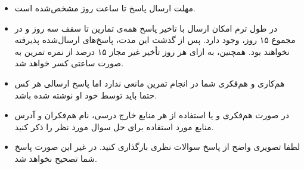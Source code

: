 \begin{itemize}
	\small
	\setlength\itemsep{0.05em}
	\item
	مهلت ارسال پاسخ تا ساعت  روز مشخص‌شده است.
	\item
	در طول ترم امکان ارسال با تاخیر  پاسخ همه‌ی تمارین تا سقف سه روز و در مجموع ۱۵ روز، وجود دارد. پس از گذشت این مدت، پاسخ‌های ارسال‌شده پذیرفته نخواهند ‌بود. همچنین، به ازای هر روز تأخیر غیر مجاز ۱۵ درصد از نمره تمرین به صورت ساعتی کسر خواهد شد.
	\item
	هم‌کاری و هم‌فکری شما در انجام تمرین مانعی ندارد اما پاسخ ارسالی هر کس حتما باید توسط خود او نوشته شده‌ باشد. 
	\item
	در صورت هم‌فکری و یا استفاده از هر منابع خارج درسی، نام هم‌فکران و آدرس منابع مورد استفاده ‌برای حل سوال مورد نظر را ذکر‌ کنید.
	\item
	لطفا تصویری واضح از پاسخ سوالات نظری بارگذاری کنید. در غیر این صورت پاسخ شما تصحیح نخواهد شد.
\end{itemize}